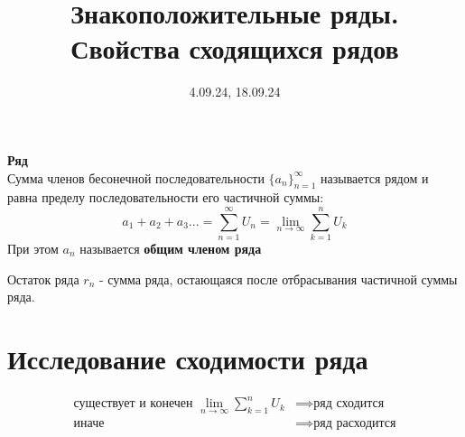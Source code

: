 

\date{4.09.24, 18.09.24}
\title{Знакоположительные ряды. \\Свойства сходящихся рядов}

\maketitle

\begin{opr}
    \textbf{Ряд}\\
    Сумма членов бесонечной последовательности
    \(\{a_{n}\}^{\infty}_{n=1}\) называется рядом
    и равна пределу последовательности 
    его частичной суммы:
    \begin{equation}
        a_{1} + a_{2} + a_{3} ... 
        = \sum_{n=1}^{\infty} U_{n}
        = \lim_{n\to\infty}\sum_{k=1}^{n} U_{k}
    \end{equation}
    При этом \(a_{n}\) называется \textbf{общим членом ряда}
\end{opr}

\begin{opr}
    Остаток ряда \(r_{n}\) - сумма ряда, остающаяся
    после отбрасывания частичной суммы ряда.
\end{opr}

\section{Исследование сходимости ряда}
\begin{opr}
    \begin{equation}
        \begin{align*}
            \text{существует и конечен } 
            \lim_{n\to\infty}\sum_{k=1}^{n} U_{k} 
            &\implies \text{ряд сходится} \\
            \text{иначе} 
            &\implies \text{ряд расходится}
        \end{align*}
    \end{equation}
\end{opr}




